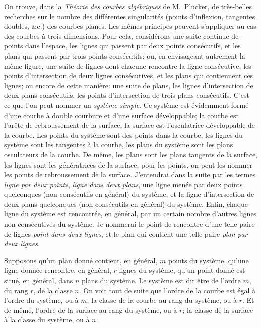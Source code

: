\documentclass[11pt]{article}
\begin{document}
On trouve, dans la \textit{Th\'eorie des courbes alg\'ebriques} de M.~Pl\"ucker, de tr\`es-belles recherches sur le nombre des diff\'erentes singularit\'es (points d'inflexion, tangentes doubles, \&c.) des courbes planes. Les m\^emes principes peuvent s'appliquer au cas des courbes \`a trois dimensions. Pour cela, consid\'erons une suite continue de points dans l'espace, les lignes qui passent par deux points cons\'ecutifs, et les plans qui passent par trois points cons\'ecutifs; ou, en envisageant autrement la m\^eme figure, une suite de lignes dont chacune rencontre la ligne cons\'ecutive, les points d'intersection de deux lignes cons\'ecutives, et les plans qui contiennent ces lignes; ou encore de cette mani\`ere: une suite de plans, les lignes d'intersection de deux plans cons\'ecutifs, les points d'intersection de trois plans cons\'ecutifs. C'est ce que l'on peut nommer un \textit{syst\`eme simple}. Ce syst\`eme est \'evidemment form\'e d'une courbe \`a double courbure et d'une surface d\'eveloppable; la courbe est l'ar\^ete de rebroussement de la surface, la surface est l'osculatrice d\'eveloppable de la courbe. Les points du syst\`eme sont des points dans la courbe, les lignes du syst\`eme sont les tangentes \`a la courbe, les plans du syst\`eme sont les plans osculateurs de la courbe. De m\^eme, les plans sont les plans tangents de la surface, les lignes sont les g\'en\'eratrices de la surface; pour les points, on peut les nommer les points de rebroussement de la surface. J'entendrai dans la suite par les termes \textit{ligne par deux points}, \textit{ligne dans deux plans}, une ligne men\'ee par deux points quelconques (non cons\'ecutifs en g\'en\'eral) du syst\`eme, et la ligne d'intersection de deux plans quelconques (non cons\'ecutifs en g\'en\'eral) du syst\`eme. Enfin, chaque ligne du syst\`eme est rencontr\'ee, en g\'en\'eral, par un certain nombre d'autres lignes non cons\'ecutives du syst\`eme. Je nommerai le point de rencontre d'une telle paire de lignes \textit{point dans deux lignes}, et le plan qui contient une telle paire \textit{plan par deux lignes}.

\newpage
\setcounter{page}{208}

Supposons qu'un plan donn\'e contient, en g\'en\'eral, $m$ points du syst\`eme, qu'une ligne donn\'ee rencontre, en g\'en\'eral, $r$ lignes du syst\`eme, qu'un point donn\'e est situ\'e, en g\'en\'eral, dans $n$ plans du syst\`eme. Le syst\`eme est dit \^etre de l'ordre $m$, du rang $r$, de la classe $n$. On voit tout de suite que l'ordre de la courbe est \'egal \`a l'ordre du syst\`eme, ou \`a $m$; la classe de la courbe au rang du syst\`eme, ou \`a $r$. Et de m\^eme, l'ordre de la surface au rang du syst\`eme, ou \`a $r$; la classe de la surface \`a la classe du syst\`eme, ou \`a $n$.
\end{document}
